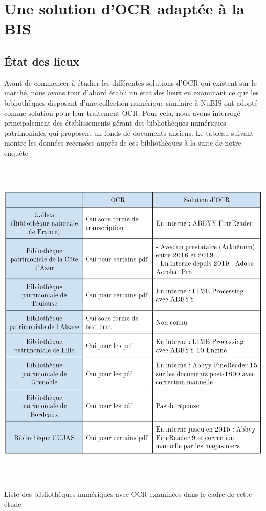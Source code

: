 \documentclass[a4paper,12pt,twoside]{book}
\begin{document}
	
	\chapter{Une solution d'OCR adaptée à la BIS}
	
	\section{État des lieux}
	
	Avant de commencer à étudier les différentes solutions d'OCR qui
	existent sur le marché, nous avons tout d'abord établi un état des lieux
	en examinant ce que les bibliothèques disposant d'une collection
	numérique similaire à NuBIS ont adopté comme solution pour leur
	traitement OCR. Pour cela, nous avons interrogé principalement des
	établissements gérant des bibliothèques numériques patrimoniales qui
	proposent un fonds de documents anciens. Le tableau suivant montre les
	données recensées auprès de ces bibliothèques à la suite de notre
	enquête \\
	
	\begin{table} [H]
		\includegraphics[width=6.26806in,height=6.38889in]{vertopal_157ae480aa4a4b07be198b586a812241/media/image12.png}
		\caption{Liste des bibliothèques numériques avec OCR examinées dans le
			cadre de cette étude}
	\end{table}
	
\end{document}

